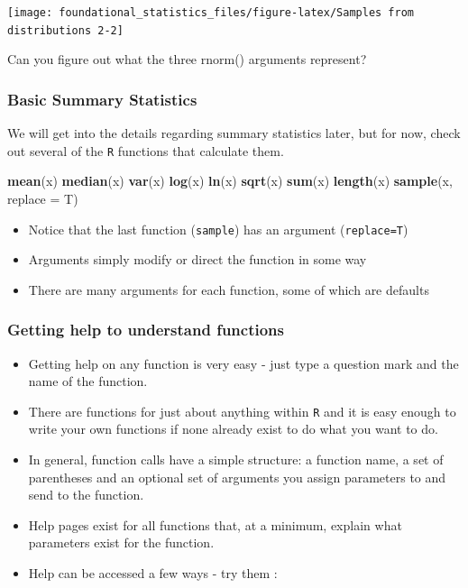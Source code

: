 \documentclass[]{book}
\newenvironment{Shaded}{\begin{snugshade}}{\end{snugshade}}
\newcommand{\DataTypeTok}[1]{\textcolor[rgb]{0.13,0.29,0.53}{#1}}
\newcommand{\KeywordTok}[1]{\textcolor[rgb]{0.13,0.29,0.53}{\textbf{#1}}}
\newcommand{\NormalTok}[1]{#1}
\begin{document}
\texttt{[image: foundational\_statistics\_files/figure-latex/Samples from distributions 2-2]}

Can you figure out what the three rnorm() arguments represent?

\hypertarget{basic-summary-statistics}{%
\subsubsection{Basic Summary Statistics}\label{basic-summary-statistics}}

We will get into the details regarding summary statistics later, but for now, check out several of the \texttt{R} functions that calculate them.

\begin{Shaded}
\begin{Highlighting}[]
\KeywordTok{mean}\NormalTok{(x)}
\KeywordTok{median}\NormalTok{(x)}
\KeywordTok{var}\NormalTok{(x)}
\KeywordTok{log}\NormalTok{(x)}
\KeywordTok{ln}\NormalTok{(x)}
\KeywordTok{sqrt}\NormalTok{(x)}
\KeywordTok{sum}\NormalTok{(x)}
\KeywordTok{length}\NormalTok{(x)}
\KeywordTok{sample}\NormalTok{(x, }\DataTypeTok{replace =}\NormalTok{ T)}
\end{Highlighting}
\end{Shaded}

\begin{itemize}
\item
  Notice that the last function (\texttt{sample}) has an argument (\texttt{replace=T})
\item
  Arguments simply modify or direct the function in some way
\item
  There are many arguments for each function, some of which are defaults
\end{itemize}

\hypertarget{getting-help-to-understand-functions}{%
\subsubsection{Getting help to understand functions}\label{getting-help-to-understand-functions}}

\begin{itemize}
\item
  Getting help on any function is very easy - just type a question mark and the name of the function.
\item
  There are functions for just about anything within \texttt{R} and it is easy enough to write your own functions if none already exist to do what you want to do.
\item
  In general, function calls have a simple structure: a function name, a set of parentheses and an optional set of arguments you assign parameters to and send to the function.
\item
  Help pages exist for all functions that, at a minimum, explain what parameters exist for the function.
\item
  Help can be accessed a few ways - try them :
\end{itemize}
\end{document}

